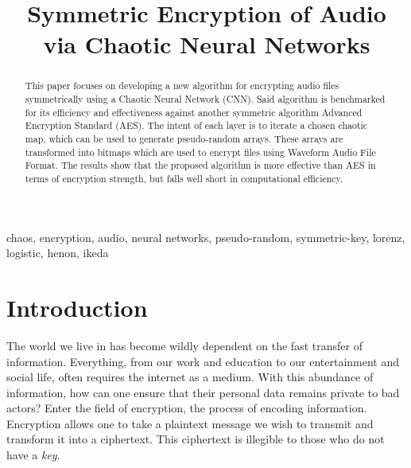 \documentclass[conference]{IEEEtran}
\begin{document}
\title{Symmetric Encryption of Audio \\ via Chaotic Neural Networks}

\author{
}

\maketitle

\begin{abstract}
This paper focuses on developing a new algorithm for encrypting audio files symmetrically using a Chaotic Neural Network (CNN).
Said algorithm is benchmarked for its efficiency and effectiveness against another symmetric algorithm Advanced Encryption Standard (AES).
The intent of each layer is to iterate a chosen chaotic map, which can be used to generate pseudo-random arrays.
These arrays are transformed into bitmaps which are used to encrypt files using Waveform Audio File Format.
The results show that the proposed algorithm is more effective than AES in terms of encryption strength, but falls well short in computational efficiency.
\end{abstract}

\begin{IEEEkeywords}
chaos, encryption, audio, neural networks, pseudo-random, symmetric-key, lorenz, logistic, henon, ikeda
\end{IEEEkeywords}

\section{Introduction}\label{sec:introduction}
The world we live in has become wildly dependent on the fast transfer of information.
Everything, from our work and education to our entertainment and social life, often requires the internet as a medium.
With this abundance of information, how can one ensure that their personal data remains private to bad actors?
Enter the field of encryption, the process of encoding information.
Encryption allows one to take a plaintext message we wish to transmit and transform it into a ciphertext.
This ciphertext is illegible to those who do not have a \textit{key}.
\end{document}
